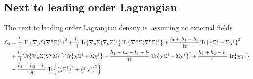 \subsection{Next to leading order Lagrangian}

The next to leading order Lagrangian density is, assuming no external fields
\begin{align}
    \notag
    \mathcal{L}_4 
    & = 
    \frac{l_1}{4} \Tr{\nabla_\mu \Sigma (\nabla^\mu \Sigma)^\dagger}^2
    + \frac{l_2}{4} \Tr{\nabla_\mu \Sigma (\nabla_\nu \Sigma)^\dagger} 
    \Tr{\nabla^\mu \Sigma (\nabla^\nu \Sigma)^\dagger} 
    +
    \frac{l_3 + h_1 - h_3 }{16} \Tr{\chi \Sigma^\dagger + \Sigma \chi^\dagger}^2
    \\ \notag
    &
    + \frac{l_4}{4}\Tr{\nabla_\mu \Sigma (\nabla^\mu \Sigma)^\dagger} \Tr{\chi \Sigma^\dagger + \Sigma \chi^\dagger}
    + \frac{h_1 - h_3 - l_4-l_7}{16} \Tr{\chi \Sigma^\dagger - \Sigma \chi^\dagger}^2
    + \frac{h_1 + h_2 - l_4}{4} \Tr{\chi \chi^\dagger} \\
    & -
    \frac{h_1 - h_3 - l_4}{8} 
        \Tr{\left(\chi \Sigma^\dagger\right)^2 + \left( \Sigma \chi^\dagger\right)^2}
    \label{NLO Lagrangian}
\end{align}
 
